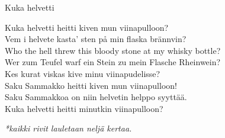 \begin{song}{Kuka helvetti}
	
	\repetitionbegin{} Kuka helvetti heitti kiven mun viinapulloon? \repetitionend{}\\
	\repetitionbegin{} Vem i helvete kasta’ sten på min flaska brännvin? \repetitionend{} \\
	\repetitionbegin{} Who the hell threw this bloody stone at my whisky bottle? \repetitionend{}\\
	\repetitionbegin{} Wer zum Teufel warf ein Stein zu mein Flasche Rheinwein? \repetitionend{}\\
	\repetitionbegin{} Kes kurat viskas kive minu viinapudelisse? \repetitionend{}\\
	\repetitionbegin{} Saku Sammakko heitti kiven mun viinapulloon! \repetitionend{}\\
	\repetitionbegin{} Saku Sammakkoa on niin helvetin helppo syyttää. \repetitionend{}\\
	\repetitionbegin{} Kuka helvetti heitti minutkin viinapulloon? \repetitionend{}
	
	\emph{*kaikki rivit lauletaan neljä kertaa.}
	
\end{song}
